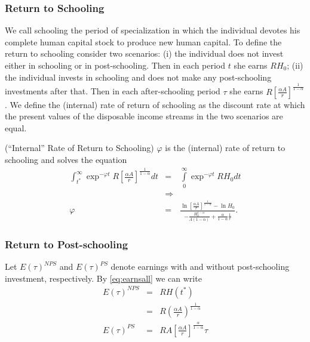 \subsubsection{Return to Schooling}
We call schooling the period of specialization in which the individual devotes his complete human capital stock to produce new human capital. %
To define the return to schooling consider two scenarios: (i) the individual does not invest either in schooling or in post-schooling. Then in each period $t$ she earns $RH_{0}$; (ii) the individual invests in schooling and does not make any post-schooling investments after that. Then in each after-schooling period $\tau$ she earns $R \left[ \frac{\alpha A}{r} \right]^{\frac{1}{1-\alpha}}$. We define the (internal) rate of return of schooling as the discount rate at which the present values of the disposable income streams in the two scenarios are equal.

\begin{definition} (``Internal'' Rate of Return to Schooling)
$\varphi$ is the (internal) rate of return to schooling and solves the equation
\begin{eqnarray}
\int _{t^*} ^{\infty} \exp^{- \varphi t} R \left[ \frac{\alpha A}{r} \right]^{\frac{1}{1-\alpha}} dt &=& \int \limits _{0} ^{\infty} \exp^{- \varphi t} R H_{0} dt \nonumber \\
&\Rightarrow& \nonumber \\
\varphi &=& \frac{\ln \left[ \frac{\alpha A}{r} \right]^{\frac{1}{1 - \alpha}} - \ln H_{0}}{-\frac{H_0^{1-\alpha}}{A(1-\alpha)}+\frac{\alpha}{1-\alpha} \frac{1}{r}}.
\end{eqnarray}
\end{definition}

\subsubsection{Return to Post-schooling}
Let $E(\tau)^{NPS}$ and $E(\tau)^{PS}$ denote earnings with and without post-schooling investment, respectively. By \eqref{eq:earnsall} we can write
\begin{eqnarray}
E(\tau)^{NPS} &=& R H(t^*) \\ \nonumber
&=& R \left( \frac{\alpha A}{r} \right)^{\frac{1}{1 - \alpha}} \\ \nonumber
E(\tau)^{PS} &=& R A \left[ \frac{\alpha A}{r} \right]^{\frac{\alpha}{1-\alpha}} \tau
\end{eqnarray}

